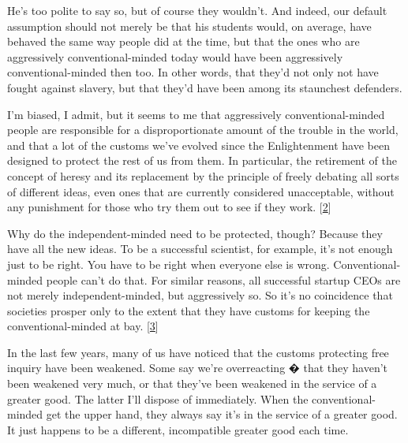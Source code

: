                   He's too polite to say so, but of course they wouldn't. And
                  indeed, our default assumption should not merely be that his
                  students would, on average, have behaved the same way people
                  did at the time, but that the ones who are aggressively
                  conventional-minded today would have been aggressively
                  conventional-minded then too. In other words, that they'd not
                  only not have fought against slavery, but that they'd have
                  been among its staunchest defenders.

I'm biased, I
                  admit, but it seems to me that aggressively
                  conventional-minded people are responsible for a
                  disproportionate amount of the trouble in the world, and that
                  a lot of the customs we've evolved since the Enlightenment
                  have been designed to protect the rest of us from them. In
                  particular, the retirement of the concept of heresy and its
                  replacement by the principle of freely debating all sorts of
                  different ideas, even ones that are currently considered
                  unacceptable, without any punishment for those who try them
                  out to see if they work.
                  [\href{\#f2n}{2}]

Why do the independent-minded need to be
                  protected, though? Because they have all the new ideas. To be
                  a successful scientist, for example, it's not enough just to
                  be right. You have to be right when everyone else is wrong.
                  Conventional-minded people can't do that. For similar reasons,
                  all successful startup CEOs are not merely independent-minded,
                  but aggressively so. So it's no coincidence that societies
                  prosper only to the extent that they have customs for keeping
                  the conventional-minded at bay.
                  [\href{\#f3n}{3}]

In the last few years, many of us have noticed
                  that the customs protecting free inquiry have been weakened.
                  Some say we're overreacting � that they haven't been weakened
                  very much, or that they've been weakened in the service of a
                  greater good. The latter I'll dispose of immediately. When the
                  conventional-minded get the upper hand, they always say it's
                  in the service of a greater good. It just happens to be a
                  different, incompatible greater good each time.

